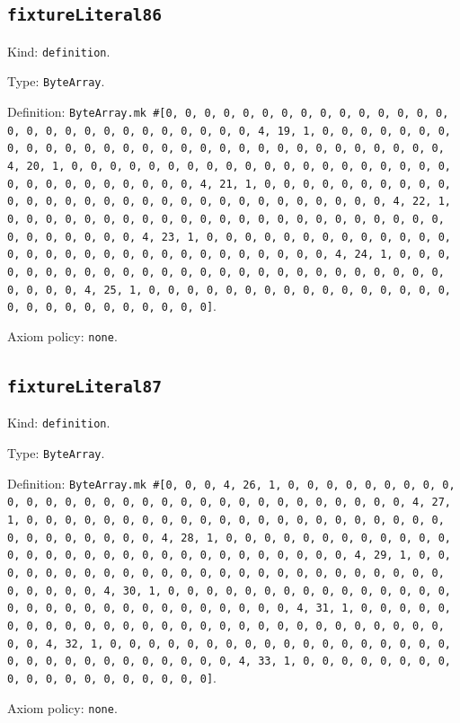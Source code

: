 \documentclass[11pt]{article}
\begin{document}
\subsection*{\texttt{fixtureLiteral86}}
\noindent Kind: \texttt{definition}.\par
\noindent Type: \texttt{ByteArray}.\par
\noindent Definition: \texttt{ByteArray.mk \#[0, 0, 0, 0, 0, 0, 0, 0, 0, 0, 0, 0, 0, 0, 0, 0, 0, 0, 0, 0, 0, 0, 0, 0, 0, 0, 0, 0, 4, 19, 1, 0, 0, 0, 0, 0, 0, 0, 0, 0, 0, 0, 0, 0, 0, 0, 0, 0, 0, 0, 0, 0, 0, 0, 0, 0, 0, 0, 0, 0, 0, 4, 20, 1, 0, 0, 0, 0, 0, 0, 0, 0, 0, 0, 0, 0, 0, 0, 0, 0, 0, 0, 0, 0, 0, 0, 0, 0, 0, 0, 0, 0, 0, 0, 4, 21, 1, 0, 0, 0, 0, 0, 0, 0, 0, 0, 0, 0, 0, 0, 0, 0, 0, 0, 0, 0, 0, 0, 0, 0, 0, 0, 0, 0, 0, 0, 0, 4, 22, 1, 0, 0, 0, 0, 0, 0, 0, 0, 0, 0, 0, 0, 0, 0, 0, 0, 0, 0, 0, 0, 0, 0, 0, 0, 0, 0, 0, 0, 0, 0, 4, 23, 1, 0, 0, 0, 0, 0, 0, 0, 0, 0, 0, 0, 0, 0, 0, 0, 0, 0, 0, 0, 0, 0, 0, 0, 0, 0, 0, 0, 0, 0, 0, 4, 24, 1, 0, 0, 0, 0, 0, 0, 0, 0, 0, 0, 0, 0, 0, 0, 0, 0, 0, 0, 0, 0, 0, 0, 0, 0, 0, 0, 0, 0, 0, 0, 4, 25, 1, 0, 0, 0, 0, 0, 0, 0, 0, 0, 0, 0, 0, 0, 0, 0, 0, 0, 0, 0, 0, 0, 0, 0, 0, 0, 0, 0]}.\par
\noindent Axiom policy: \texttt{none}.\par
\subsection*{\texttt{fixtureLiteral87}}
\noindent Kind: \texttt{definition}.\par
\noindent Type: \texttt{ByteArray}.\par
\noindent Definition: \texttt{ByteArray.mk \#[0, 0, 0, 4, 26, 1, 0, 0, 0, 0, 0, 0, 0, 0, 0, 0, 0, 0, 0, 0, 0, 0, 0, 0, 0, 0, 0, 0, 0, 0, 0, 0, 0, 0, 0, 0, 4, 27, 1, 0, 0, 0, 0, 0, 0, 0, 0, 0, 0, 0, 0, 0, 0, 0, 0, 0, 0, 0, 0, 0, 0, 0, 0, 0, 0, 0, 0, 0, 0, 4, 28, 1, 0, 0, 0, 0, 0, 0, 0, 0, 0, 0, 0, 0, 0, 0, 0, 0, 0, 0, 0, 0, 0, 0, 0, 0, 0, 0, 0, 0, 0, 0, 4, 29, 1, 0, 0, 0, 0, 0, 0, 0, 0, 0, 0, 0, 0, 0, 0, 0, 0, 0, 0, 0, 0, 0, 0, 0, 0, 0, 0, 0, 0, 0, 0, 4, 30, 1, 0, 0, 0, 0, 0, 0, 0, 0, 0, 0, 0, 0, 0, 0, 0, 0, 0, 0, 0, 0, 0, 0, 0, 0, 0, 0, 0, 0, 0, 0, 4, 31, 1, 0, 0, 0, 0, 0, 0, 0, 0, 0, 0, 0, 0, 0, 0, 0, 0, 0, 0, 0, 0, 0, 0, 0, 0, 0, 0, 0, 0, 0, 0, 4, 32, 1, 0, 0, 0, 0, 0, 0, 0, 0, 0, 0, 0, 0, 0, 0, 0, 0, 0, 0, 0, 0, 0, 0, 0, 0, 0, 0, 0, 0, 0, 0, 4, 33, 1, 0, 0, 0, 0, 0, 0, 0, 0, 0, 0, 0, 0, 0, 0, 0, 0, 0, 0, 0]}.\par
\noindent Axiom policy: \texttt{none}.\par
\end{document}

